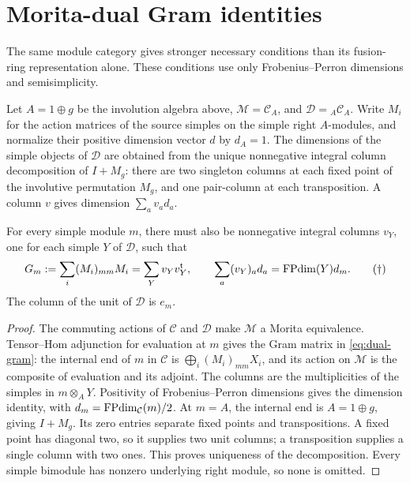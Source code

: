 \section{Morita-dual Gram identities}
\label{sec:dual-gram}
The same module category gives stronger necessary conditions than its
fusion-ring representation alone. These conditions use only
Frobenius--Perron dimensions and semisimplicity.

\begin{proposition}
\label{prop:dual-gram}
Let $A=1\oplus g$ be the involution algebra above,
$\mathcal M=\mathcal C_A$, and $\mathcal D={}_A\mathcal C_A$.
Write $M_i$ for the action matrices of the source simples on the
simple right $A$-modules, and normalize their positive dimension
vector $d$ by $d_A=1$. The dimensions of the simple objects of
$\mathcal D$ are obtained from the unique nonnegative integral
column decomposition of $I+M_g$: there are two singleton columns at
each fixed point of the involutive permutation $M_g$, and one
pair-column at each transposition. A column $v$ gives dimension
$\sum_a v_a d_a$.

For every simple module $m$, there must also be nonnegative integral
columns $v_Y$, one for each simple $Y$ of $\mathcal D$, such that
\[
 G_m:=\sum_i(M_i)_{mm}M_i=\sum_Yv_Yv_Y^{\mathsf t},\qquad
 \sum_a(v_Y)_a d_a=\operatorname{FPdim}(Y)d_m.
 \tag{$\dagger$}\label{eq:dual-gram}
\]
The column of the unit of $\mathcal D$ is $e_m$.
\end{proposition}
\begin{proof}
The commuting actions of $\mathcal C$ and $\mathcal D$ make
$\mathcal M$ a Morita equivalence. Tensor--Hom adjunction for
evaluation at $m$ gives the Gram matrix in
\eqref{eq:dual-gram}: the internal end of $m$ in $\mathcal C$ is
$\bigoplus_i(M_i)_{mm}X_i$, and its action on $\mathcal M$ is the
composite of evaluation and its adjoint. The columns are the
multiplicities of the simples in $m\otimes_A Y$. Positivity of
Frobenius--Perron dimensions gives the dimension identity, with
$d_m=\operatorname{FPdim}_{\mathcal C}(m)/2$.
At $m=A$, the internal end is $A=1\oplus g$, giving $I+M_g$.
Its zero entries separate fixed points and transpositions. A fixed
point has diagonal two, so it supplies two unit columns; a
transposition supplies a single column with two ones. This proves
uniqueness of the decomposition. Every simple bimodule has nonzero
underlying right module, so none is omitted.
\end{proof}

